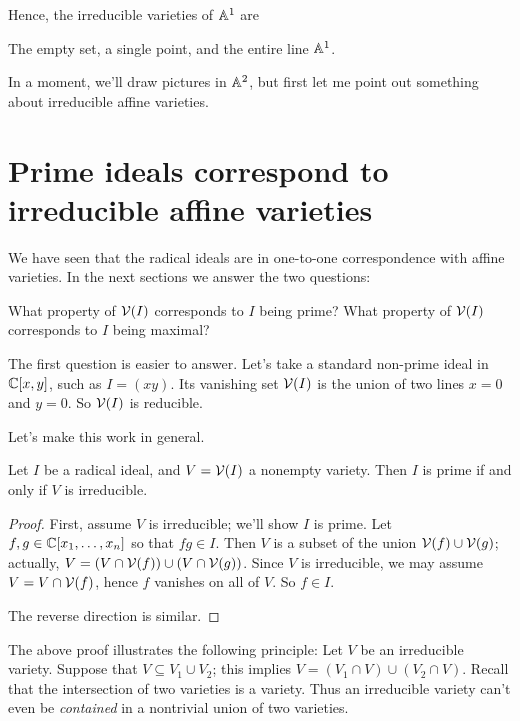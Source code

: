 Hence, the irreducible varieties of $\mathbb A^1$ are
\begin{enumerate}[(i)]
	\ii The empty set,
	\ii a single point, and
	\ii the entire line $\mathbb A^1$.
\end{enumerate}

In a moment, we'll draw pictures in $\mathbb A^2$,
but first let me point out something about irreducible affine varieties.

\section{Prime ideals correspond to irreducible affine varieties}
We have seen that the radical ideals are in one-to-one correspondence
with affine varieties.
In the next sections we answer the two questions:
\begin{itemize}
	\ii What property of $\mathcal V(I)$ corresponds to $I$ being prime?
	\ii What property of $\mathcal V(I)$ corresponds to $I$ being maximal?
\end{itemize}
The first question is easier to answer.
Let's take a standard non-prime ideal in $\mathbb C[x,y]$, such as $I = (xy)$.
Its vanishing set $\mathcal V(I)$ is the union of two lines $x=0$ and $y=0$.
So $\mathcal V(I)$ is reducible.

Let's make this work in general.
\begin{theorem}
	Let $I$ be a radical ideal, and $V = \mathcal V(I)$ a nonempty variety.
	Then $I$ is prime if and only if $V$ is irreducible.
\end{theorem}
\begin{proof}
	First, assume $V$ is irreducible; we'll show $I$ is prime.
	Let $f,g \in \mathbb C[x_1, \dots, x_n]$ so that $fg \in I$.
	Then $V$ is a subset of the union $\mathcal V(f) \cup \mathcal V(g)$;
	actually, $V = \left( V \cap \mathcal V(f) \right) \cup \left( V \cap \mathcal V(g) \right)$.
	Since $V$ is irreducible, we may assume $V = V \cap \mathcal V(f)$,
	hence $f$ vanishes on all of $V$. So $f \in I$.

	The reverse direction is similar.
\end{proof}

\begin{remark}
	The above proof illustrates the following principle:
	Let $V$ be an irreducible variety.
	Suppose that $V \subseteq V_1 \cup V_2$;
	this implies $V = (V_1 \cap V) \cup (V_2 \cap V)$.
	Recall that the intersection of two varieties is a variety.
	Thus an irreducible variety can't even be \emph{contained}
	in a nontrivial union of two varieties.
\end{remark}


